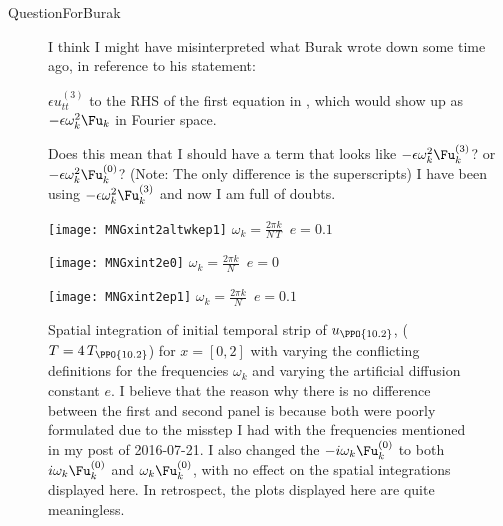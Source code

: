 \begin{description}
{\begin{description}
\item[QuestionForBurak]
I think I might have misinterpreted what Burak wrote down some time ago, in reference to his statement:

$\epsilon u^{(3)}_{tt}$ to the RHS of the first equation in , which would show up as $- \epsilon \omega_k^2 \Fu_k$ in Fourier space.

Does this mean that I should have a term that looks like $- \epsilon \omega_k^2 \Fu^{(3)}_{k}$? or $- \epsilon \omega_k^2 \Fu^{(0)}_{k}$? (Note: The only difference is the superscripts) I have been using $- \epsilon \omega_k^2 \Fu^{(3)}_{k}$ and now I am full of doubts.


\end{description}
    }


\begin{figure}[ht]
  \begin{minipage}[height=.40\textheight]{.32\textwidth}
    \centering
    \texttt{[image: MNGxint2altwkep1]}
    \small{\texttt{$\omega_k = \frac{2 \pi k}{N\,T}$ $e=0.1$}}
  \end{minipage}
  \begin{minipage}[height=.40\textheight]{.32\textwidth}
    \centering
    \texttt{[image: MNGxint2e0]}
    \small{\texttt{$\omega_k = \frac{2 \pi k}{N}$ $e=0$}}
  \end{minipage}
  \begin{minipage}[height=.40\textheight]{.32\textwidth}
    \centering
    \texttt{[image: MNGxint2ep1]}
    \small{\texttt{$\omega_k = \frac{2 \pi k}{N}$ $e=0.1$}}
  \end{minipage}
  \caption{
  Spatial integration of initial temporal strip of $u_{\PPO{10.2}}$,
  ($T=4\,T_{\PPO{10.2}}$) for $x = [0,2]$ with varying the conflicting
  definitions for the frequencies $\omega_k$ and varying the artificial
  diffusion constant $e$.
  I believe that the reason why there is no difference between
  the first and second panel is
  because both were poorly formulated due to the misstep I had with the
  frequencies mentioned in my post of 2016-07-21.
  I also changed the $- i \omega_k \Fu^{(0)}_k$ to both $i \omega_k
  \Fu^{(0)}_k$ and  $\omega_k \Fu^{(0)}_k$, with no effect on the spatial
  integrations displayed here. In retrospect, the plots displayed here
  are quite meaningless.
  }
  \label{fig:MNGxint2}
\end{figure}


\end{description}
